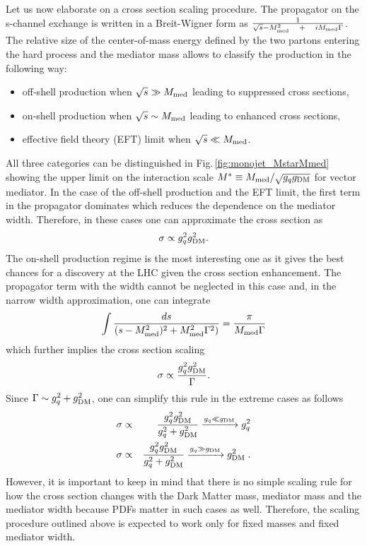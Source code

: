 Let us now elaborate on a cross section scaling procedure.
The propagator on the s-channel exchange is written in a Breit-Wigner form as $\frac{1}{\sqrt{s}-M_{\rm{med}}^2 \quad+\quad iM_{\rm{med}}\Gamma}$. The relative size of the center-of-mass energy defined by the two partons entering the hard process and the mediator mass allows to classify the production in the following way:
\begin{itemize}
\item off-shell production when $\sqrt{s} \gg M_{\rm{med}}$ leading to suppressed cross sections,
\item on-shell production when $\sqrt{s} \sim M_{\rm{med}}$ leading to enhanced cross sections,
\item effective field theory (EFT) limit when $\sqrt{s} \ll M_{\rm{med}}$.
\end{itemize}
All three categories can be distinguished in Fig.\,\ref{fig:monojet_MstarMmed} showing the upper limit on the interaction scale $M^{*} \equiv M_{\rm{med}}/\sqrt{g_qg_{\rm{DM}}}$ for vector mediator. 
In the case of the off-shell production and the EFT limit, the first term in the propagator dominates which reduces the dependence on the mediator width. Therefore, in these cases one can approximate the cross section as
\begin{equation}
\sigma \propto g_q^2g_{\rm{DM}}^2.
\end{equation}
The on-shell production regime is the most interesting one as it gives the best chances for a discovery at the LHC given the cross section enhancement. The propagator term with the width cannot be neglected in this case and, in the narrow width approximation, one can integrate
\begin{equation}
\int \frac{ds}{(s-M_{\rm{med}}^2)^2 + M_{\rm{med}}^2\Gamma^2)} = \frac{\pi}{M_{\rm{med}}\Gamma}
\end{equation}
which further implies the cross section scaling
\begin{equation}
\sigma \propto \frac{g_q^2\gDM^2}{\Gamma}.
\label{eq:monojet_scaling}
\end{equation}
Since $\Gamma \sim g_q^2+g_{\rm{DM}}^2$, one can simplify this rule in the extreme cases as follows
\begin{eqnarray}
\sigma &\propto& \frac{g_q^2\gDM^2}{g_q^2+\gDM^2} \xrightarrow{g_q \ll \gDM} g_q^2 \label{eq:monojet_gSM} \\
\sigma &\propto& \frac{g_q^2\gDM^2}{g_q^2+\gDM^2} \xrightarrow{g_q \gg \gDM} \gDM^2 \label{eq:monojet_gDM} \;.
\end{eqnarray}
However, it is important to keep in mind that there is no simple scaling rule for how the cross section changes with the Dark Matter mass, mediator mass and the mediator width because PDFs matter in such cases as well.
Therefore, the scaling procedure outlined above is expected to work only for fixed masses and fixed mediator width.


